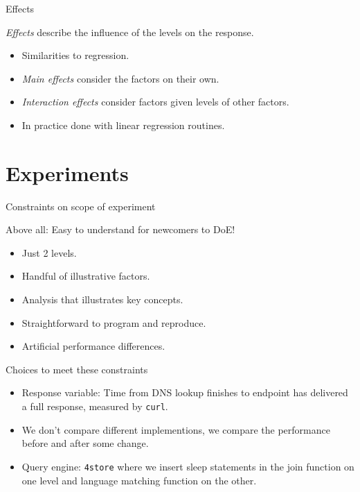 \documentclass[english,handout,aspectratio=169]{ifislide}
\begin{document}
\begin{frame}{Effects}

\Large
\emph{Effects} describe the influence of the levels on the response.
\normalsize

\begin{itemize}
\item Similarities to regression.
\item \emph{Main effects} consider the factors on their own.
\item \emph{Interaction effects} consider factors given levels of
  other factors.
\item In practice done with linear regression routines.
\end{itemize}

\end{frame}



\section{Experiments}

\begin{frame}{Constraints on scope of experiment}

Above all: Easy to understand for newcomers to DoE!

\begin{itemize}
\item Just 2 levels.
\item Handful of illustrative factors.
\item Analysis that illustrates key concepts.
\item Straightforward to program and reproduce.
\item Artificial performance differences.
\end{itemize}

\end{frame}

\begin{frame}{Choices to meet these constraints}

  \begin{itemize}
  \item Response variable: Time from DNS lookup finishes to endpoint
    has delivered a full response, measured by \texttt{curl}.
  \item We don't compare different implementions, we compare the
    performance before and after some change.
  \item Query engine: \texttt{4store} where we insert \textsf{sleep}
    statements in the join function on one level and language matching
    function on the other. 
  \end{itemize}

\end{frame}
\end{document}
